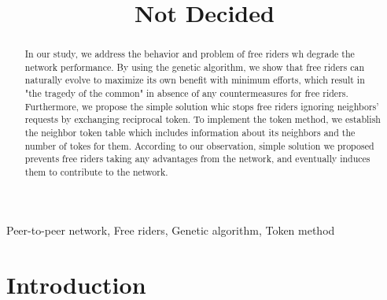 \documentclass[12pt,journal,draftcls,letterpaper,onecolumn]{IEEEtran}
\begin{document}
\title{Not Decided}
\maketitle

\begin{abstract}

In our study, we address the behavior and problem of free riders wh degrade
the network performance. By using the genetic algorithm, we show that free riders
can naturally evolve to maximize its own benefit with minimum efforts, which result
in "the tragedy of the common" in absence of any countermeasures for free riders.
Furthermore, we propose the simple solution whic stops free riders ignoring neighbors'
requests by exchanging reciprocal token. To implement the token method, we establish
the neighbor token table which includes information about its neighbors and the number
of tokes for them. According to our observation, simple solution we proposed prevents
free riders taking any advantages from the network, and eventually induces them to 
contribute to the network.
\end{abstract}

\begin{IEEEkeywords}
Peer-to-peer network, Free riders, Genetic algorithm, Token method
\end{IEEEkeywords}

\IEEEpeerreviewmaketitle
\section{Introduction}\label{sec:introduction}
\end{document}
